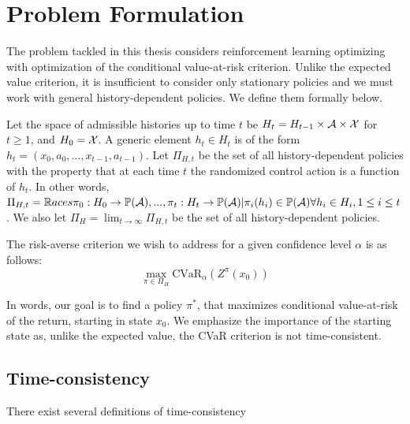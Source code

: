 
\section{Problem Formulation}\label{sec:prelim:problem}

The problem tackled in this thesis considers reinforcement learning optimizing with optimization of the conditional value-at-risk criterion. Unlike the expected value criterion, it is insufficient to consider only stationary policies and we must work with general history-dependent policies. We define them formally below.

\begin{definition}
Let the space of admissible histories up to time $t$ be $H_t = H_{t-1} \times \mathcal{A} \times \mathcal{X}$ for $t \ge 1$, and $H_0 = \mathcal{X}$. A generic element $h_t \in H_t$ is of the form $h_t = (x_0, a_0, ..., x_{t-1}, a_{t-1})$. Let $\Pi_{H,t}$ be the set of all history-dependent policies with the property that at each time $t$ the randomized control action is a function of $h_t$. In other words, 
$\Pi_{H,t} = \mathbb{R}aces{\pi_0: H_0 \to \mathbb{P}(\mathcal{A}), ..., \pi_t: H_t \to \mathbb{P}(\mathcal{A})|\pi_i(h_i) \in \mathbb{P}(\mathcal{A}) \forall h_i \in H_i, 1\le i\le t}$. We also let $\Pi_H = \lim_{t\to\infty}\Pi_{H,t}$ be the set of all history-dependent policies.
\end{definition}

The risk-averse criterion we wish to address for a given confidence level $\alpha$ is as follows:
\begin{equation}\label{eqn:prelim:problem}
\max_{\pi \in \Pi_H} \text{CVaR}_\alpha(Z^\pi(x_0))
\end{equation}

In words, our goal is to find a policy $\pi^*$, that maximizes conditional value-at-risk of the return, starting in state $x_0$. We emphasize the importance of the starting state as, unlike the expected value, the CVaR criterion is not time-consistent.


\subsection{Time-consistency}

There exist several definitions of time-consistency \cite{many}


